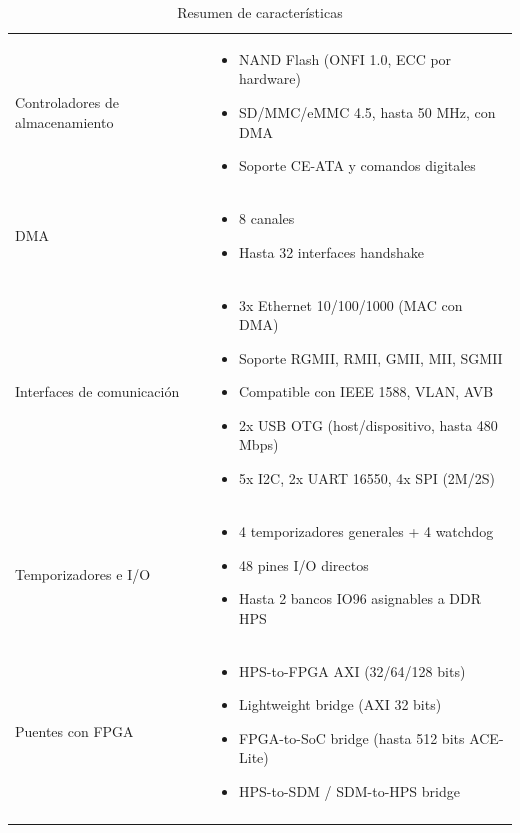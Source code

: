 \begin{longtable}{p{} | p{}}
Controladores de almacenamiento &
\begin{itemize}
  \item NAND Flash (ONFI 1.0, ECC por hardware)
  \item SD/MMC/eMMC 4.5, hasta 50 MHz, con DMA
  \item Soporte CE-ATA y comandos digitales
\end{itemize} \\

DMA &
\begin{itemize}
  \item 8 canales
  \item Hasta 32 interfaces handshake
\end{itemize} \\

Interfaces de comunicación &
\begin{itemize}
  \item 3x Ethernet 10/100/1000 (MAC con DMA)
  \item Soporte RGMII, RMII, GMII, MII, SGMII
  \item Compatible con IEEE 1588, VLAN, AVB
  \item 2x USB OTG (host/dispositivo, hasta 480 Mbps)
  \item 5x I2C, 2x UART 16550, 4x SPI (2M/2S)
\end{itemize} \\

Temporizadores e I/O &
\begin{itemize}
  \item 4 temporizadores generales + 4 watchdog
  \item 48 pines I/O directos
  \item Hasta 2 bancos IO96 asignables a DDR HPS
\end{itemize} \\

Puentes con FPGA &
\begin{itemize}
  \item HPS-to-FPGA AXI (32/64/128 bits)
  \item Lightweight bridge (AXI 32 bits)
  \item FPGA-to-SoC bridge (hasta 512 bits ACE-Lite)
  \item HPS-to-SDM / SDM-to-HPS bridge
\end{itemize} \\
\hline

\caption{Resumen de caracter\'isticas}
\end{longtable}

